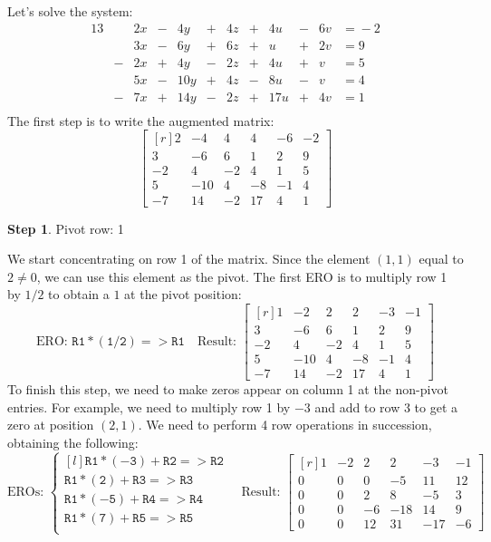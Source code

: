 \documentclass[12pt]{article}
\begin{document}
\begin{example} Let's solve the system:
\begin{alignat*}{13}
 &{}{}& 2 x &{}-{}& 4 y &{}+{}& 4 z &{}+{}& 4 u &{}-{}& 6 v &{}={}-2\\ 
 &{}{}& 3 x &{}-{}& 6 y &{}+{}& 6 z &{}+{}& u &{}+{}& 2 v &{}={}9\\ 
 &{}-{}& 2 x &{}+{}& 4 y &{}-{}& 2 z &{}+{}& 4 u &{}+{}& v &{}={}5\\ 
 &{}{}& 5 x &{}-{}& 10 y &{}+{}& 4 z &{}-{}& 8 u &{}-{}& v &{}={}4\\ 
 &{}-{}& 7 x &{}+{}& 14 y &{}-{}& 2 z &{}+{}& 17 u &{}+{}& 4 v &{}={}1\\ 
\end{alignat*}
The first step is to write the augmented matrix:
\[
\left[\begin{matrix*}[r]2 & -4 & 4 & 4 & -6 & -2\\3 & -6 & 6 & 1 & 2 & 9\\-2 & 4 & -2 & 4 & 1 & 5\\5 & -10 & 4 & -8 & -1 & 4\\-7 & 14 & -2 & 17 & 4 & 1\end{matrix*}\right]
\]

\textbf{Step 1}. Pivot row: 1 

We start concentrating on row 1 of the matrix. Since the element $(1,1)$ equal to $2\ne 0$, we can use this element as the pivot. The first ERO is to multiply row 1 by $1/2$ to obtain a $1$ at the pivot position:
\[
\text{ERO: }\mathtt{R1*(1/2)=>R1}\quad\text{Result: }
\left[\begin{matrix*}[r]1 & -2 & 2 & 2 & -3 & -1\\3 & -6 & 6 & 1 & 2 & 9\\-2 & 4 & -2 & 4 & 1 & 5\\5 & -10 & 4 & -8 & -1 & 4\\-7 & 14 & -2 & 17 & 4 & 1\end{matrix*}\right]
\]
To finish this step, we need to make zeros appear on column 1 at the non-pivot entries. For example, we need to multiply row 1 by $-3$ and add to row 3 to get a zero at position $(2,1)$. We need to perform 4 row operations in succession, obtaining the following:
\[
\text{EROs: }
\left\{\begin{matrix*}[l]
\mathtt{R1*(-3)+R2=>R2}\\
\mathtt{R1*(2)+R3=>R3}\\
\mathtt{R1*(-5)+R4=>R4}\\
\mathtt{R1*(7)+R5=>R5}\\
\end{matrix*}\right.
\quad 
\text{Result: }
\left[\begin{matrix*}[r]1 & -2 & 2 & 2 & -3 & -1\\0 & 0 & 0 & -5 & 11 & 12\\0 & 0 & 2 & 8 & -5 & 3\\0 & 0 & -6 & -18 & 14 & 9\\0 & 0 & 12 & 31 & -17 & -6\end{matrix*}\right]
\]


\end{example}
\end{document}
